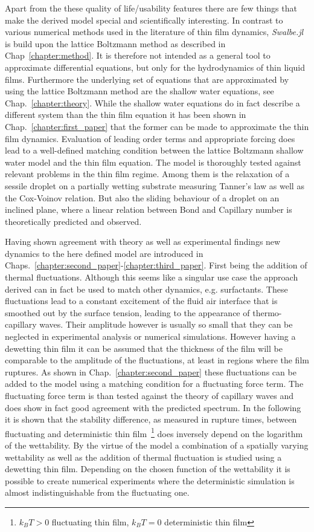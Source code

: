 Apart from the these quality of life/usability features there are few things that make the derived model special and scientifically interesting.
In contrast to various numerical methods used in the literature of thin film dynamics, \textit{Swalbe.jl} is build upon the lattice Boltzmann method as described in Chap~\ref{chapter:method}.
It is therefore not intended as a general tool to approximate differential equations, but only for the hydrodynamics of thin liquid films.
Furthermore the underlying set of equations that are approximated by using the lattice Boltzmann method are the shallow water equations, see Chap.~\ref{chapter:theory}.
While the shallow water equations do in fact describe a different system than the thin film equation it has been shown in Chap.~\ref{chapter:first_paper} that the former can be made to approximate the thin film dynamics.
Evaluation of leading order terms and appropriate forcing does lead to a well-defined matching condition between the lattice Boltzmann shallow water model and the thin film equation.
The model is thoroughly tested against relevant problems in the thin film regime. 
Among them is the relaxation of a sessile droplet on a partially wetting substrate measuring Tanner's law as well as the Cox-Voinov relation.
But also the sliding behaviour of a droplet on an inclined plane, where a linear relation between Bond and Capillary number is theoretically predicted and observed.

Having shown agreement with theory as well as experimental findings new dynamics to the here defined model are introduced in Chaps.~\ref{chapter:second_paper}-\ref{chapter:third_paper}.  
First being the addition of thermal fluctuations.
Although this seems like a singular use case the approach derived can in fact be used to match other dynamics, e.g. surfactants.
These fluctuations lead to a constant excitement of the fluid air interface that is smoothed out by the surface tension, leading to the appearance of thermo-capillary waves.
Their amplitude however is usually so small that they can be neglected in experimental analysis or numerical simulations. 
However having a dewetting thin film it can be assumed that the thickness of the film will be comparable to the amplitude of the fluctuations, at least in regions where the film ruptures.
As shown in Chap.~\ref{chapter:second_paper} these fluctuations can be added to the model using a matching condition for a fluctuating force term. 
The fluctuating force term is than tested against the theory of capillary waves and does show in fact good agreement with the predicted spectrum.
In the following it is shown that the stability difference, as measured in rupture times, between fluctuating and deterministic thin film~\footnote{$k_BT > 0$ fluctuating thin film, $k_BT = 0$ deterministic thin film} does inversely depend on the logarithm of the wettability. 
By the virtue of the model a combination of a spatially varying wettability as well as the addition of thermal fluctuation is studied using a dewetting thin film.
Depending on the chosen function of the wettability it is possible to create numerical experiments where the deterministic simulation is almost indistinguishable from the fluctuating one.

